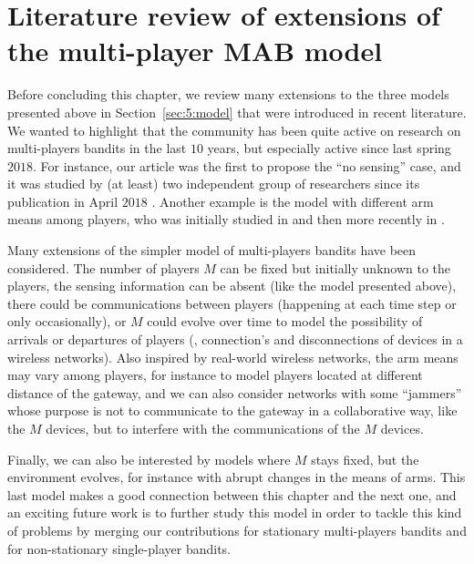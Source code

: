 \section{Literature review of extensions of the multi-player MAB model}
\label{sec:5:literatureReviewOtherModels}

Before concluding this chapter, we review many extensions to the three models presented above in Section~\ref{sec:5:model} that were introduced in recent literature.
%
We wanted to highlight that the community has been quite active on research on multi-players bandits in the last $10$ years, but especially active since last spring $2018$.
For instance, our article \cite{Besson2018ALT} was the first to propose the ``no sensing'' case, and it was studied by (at least) two independent group of researchers since its publication in April $2018$ \cite{BoursierPerchet18,LugosiMehrabian18}.
Another example is the model with different arm means among players, who was initially studied in \cite{Anandkumar10,Kalathil12} and then more recently in \cite{Bistritz18,KaufmannAbbas19}.
%

Many extensions of the simpler model of multi-players bandits have been considered.
The number of players $M$ can be fixed but initially unknown to the players, the sensing information can be absent (like the model \modeltrois{} presented above), there could be communications between players (happening at each time step or only occasionally), or $M$ could evolve over time to model the possibility of arrivals or departures of players (\ie, connection's and disconnections of devices in a wireless networks).
Also inspired by real-world wireless networks, the arm means may vary among players, for instance to model players located at different distance of the gateway, and we can also consider networks with some ``jammers'' whose purpose is not to communicate to the gateway in a collaborative way, like the $M$ devices, but to interfere with the communications of the $M$ devices.

Finally, we can also be interested by models where $M$ stays fixed, but the environment evolves, for instance with abrupt changes in the means of arms. This last model makes a good connection between this chapter and the next one, and an exciting future work is to further study this model in order to tackle this kind of problems by merging our contributions for stationary multi-players bandits and for non-stationary single-player bandits.

